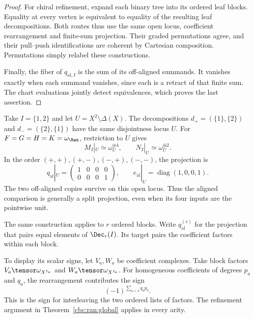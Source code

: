 \begin{proof}
For chiral refinement, expand each binary tree into its ordered leaf
blocks. Equality at every vertex is equivalent to equality of the
resulting leaf decompositions. Both routes thus use the same open
locus, coefficient rearrangement and finite-sum projection.
Their graded permutations agree, and their pull--push identifications
are coherent by Cartesian composition. Permutations simply relabel
these constructions.

Finally, the fiber of $q_{\mathrm{al},I}$ is the sum of its off-aligned
summands. It vanishes exactly when each summand vanishes, since each
is a retract of that finite sum. The chart evaluations jointly detect
equivalences, which proves the last assertion.
\end{proof}

\begin{example}
\label{cbc:ran:two-points}
Take $I=\{1,2\}$ and let $U=X^2\setminus\Delta(X)$.
The decompositions $d_+=(\{1\},\{2\})$ and
$d_-=(\{2\},\{1\})$ have the same disjointness locus $U$.
For $F=G=H=K=\omega_{\Ran}$, restriction to $U$ gives
\[
 M_I|_U\simeq\omega_U^{\oplus4},\qquad
 N_I|_U\simeq\omega_U^{\oplus2}.
\]
In the order $(+,+),(+,-),(-,+),(-,-)$, the projection is
\[
 q_{\mathrm{al}}|_U=
 \begin{pmatrix}1&0&0&0\\0&0&0&1\end{pmatrix},
 \qquad
 e_{\mathrm{al}}|_U=\operatorname{diag}(1,0,0,1).
\]
The two off-aligned copies survive on this open locus.
Thus the aligned comparison is generally a split projection, even
when its four inputs are the pointwise unit.
\end{example}

The same construction applies to $r$ ordered blocks.
Write $q_{\mathrm{al}}^{(r)}$ for the projection that pairs equal
elements of $\Dec_r(I)$. Its target pairs the coefficient factors
within each block.

To display its scalar signs, let $V_a,W_a$ be coefficient complexes.
Take block factors $V_a\tensor\omega_{X^{I_a}}$ and
$W_a\tensor\omega_{X^{I_a}}$. For homogeneous coefficients of degrees
$p_a$ and $q_a$, the rearrangement contributes the sign
\[
 (-1)^{\sum_{a<b}q_a p_b}.
\]
This is the sign for interleaving the two ordered lists of factors.
The refinement argument in Theorem~\ref{cbc:ran:global} applies in every arity.


